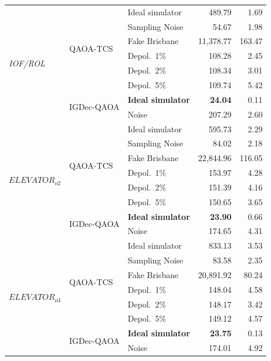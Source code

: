\begin{table}[ht]
{\begin{tabular}{lllrr}
\midrule
\multirow{8}{*}{\textit{IOF/ROL}}
& \multirow{6}{*}{QAOA-TCS}
  & Ideal simulator   & 489.79  & 1.69    \\
& & Sampling Noise    & 54.67   & 1.98    \\
& & Fake Brisbane     & 11,378.77 & 163.47 \\
& & Depol.\ 1\%       & 108.28  & 2.45    \\
& & Depol.\ 2\%       & 108.34  & 3.01    \\
& & Depol.\ 5\%       & 109.74  & 5.42    \\
\cmidrule(lr){2-5}
& \multirow{2}{*}{IGDec-QAOA}
  & \textbf{Ideal simulator}   & \textbf{24.04}   & 0.11    \\
& & Noise             & 207.29  & 2.60    \\

\midrule
\multirow{8}{*}{\textit{$ELEVATOR_{o2}$}}
& \multirow{6}{*}{QAOA-TCS}
  & Ideal simulator   & 595.73  & 2.29    \\
& & Sampling Noise    & 84.02   & 2.18    \\
& & Fake Brisbane     & 22,844.96 & 116.05 \\
& & Depol.\ 1\%       & 153.97  & 4.28    \\
& & Depol.\ 2\%       & 151.39  & 4.16    \\
& & Depol.\ 5\%       & 150.65  & 3.65    \\
\cmidrule(lr){2-5}
& \multirow{2}{*}{IGDec-QAOA}
  & \textbf{Ideal simulator}   & \textbf{23.90}   & 0.66    \\
& & Noise             & 174.65  & 4.31    \\

\midrule
\multirow{8}{*}{\textit{$ELEVATOR_{o3}$}}
& \multirow{6}{*}{QAOA-TCS}
  & Ideal simulator   & 833.13  & 3.53    \\
& & Sampling Noise    & 83.58   & 2.35    \\
& & Fake Brisbane     & 20,891.92 & 80.24  \\
& & Depol.\ 1\%       & 148.04  & 4.58    \\
& & Depol.\ 2\%       & 148.17  & 3.42    \\
& & Depol.\ 5\%       & 149.12  & 4.57    \\
\cmidrule(lr){2-5}
& \multirow{2}{*}{IGDec-QAOA}
  & \textbf{Ideal simulator}   & \textbf{23.75}   & 0.13    \\
& & Noise             & 174.01  & 4.92    \\
\bottomrule
\end{tabular}}
\end{table}

